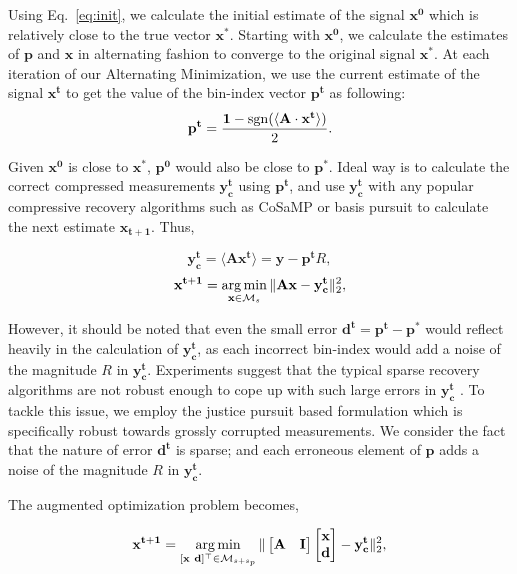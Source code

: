 Using Eq.~\ref{eq:init}, we calculate the initial estimate of the signal $\mathbf{{x}^0}$ which is relatively close to the true vector $\mathbf{x^*}$. Starting with $\mathbf{{x}^0}$, we  calculate the estimates of $\mathbf{p}$ and $\mathbf{x}$ in alternating fashion to converge to the original signal $\mathbf{x^*}$. At each iteration of our Alternating Minimization, we use the current estimate of the signal ${\mathbf{x^t}}$ to get the value of the bin-index vector $\mathbf{{p}^t}$ as following:
\begin{equation}
\mathbf{{p}^{t}} = \frac{\mathbf{1}-\mathrm{sgn}(\langle \mathbf{A} \cdot \mathbf{x^t} \rangle)}{2}.
\label{step1}
\end{equation}

Given $\mathbf{x^0}$ is close to $\mathbf{x^*}$, $\mathbf{p^0}$ would also be close to $\mathbf{p^*}$. Ideal way is to calculate the correct compressed measurements $\mathbf{y^t_c}$ using $\mathbf{p^t}$, and use $\mathbf{y^t_c}$ with any popular compressive recovery algorithms such as CoSaMP or basis pursuit to calculate the next estimate $\mathbf{{x}_{t+1}}$. Thus,


$$
\mathbf{y^t_c} = \langle \mathbf{A}\mathbf{x^{t}} \rangle = \mathbf{y} - \mathbf{p^t}R,
$$
$$
\mathbf{{x}^{t+1}} = \argmin_{\mathbf{x} \in \mathcal{M}_s}\norm{\mathbf{Ax} - \mathbf{y^t_c}}_2^2, %
$$

However, it should be noted that even the small error $\mathbf{d^t} = \mathbf{p^t - p^*}$ would reflect heavily in the calculation of $\mathbf{y^t_c}$, as each incorrect bin-index would add a noise of the magnitude $R$ in $\mathbf{y^t_c}$. Experiments suggest that the typical sparse recovery algorithms are not robust enough to cope up with such large errors in $\mathbf{y^t_c}$ \cite{Laska2009}. To tackle this issue, we employ the justice pursuit based formulation which is specifically robust towards grossly corrupted measurements. We consider the fact that the nature of error $\mathbf{d^t}$ is sparse; and each erroneous element of $\mathbf{p}$ adds a noise of the magnitude $R$ in $\mathbf{y^t_c}$.

The augmented optimization problem becomes,

$$
\mathbf{{x}^{t+1}}=\argmin_{[\mathbf{x~d}]^\t \in \mathcal{M}_{s+s_p}}\norm{\begin{bmatrix} \mathbf{A} & \mathbf{I} \end{bmatrix} \begin{bmatrix} \mathbf{x} \\ \mathbf{d} \end{bmatrix} - \mathbf{y^t_c}}_2^2, %
$$

